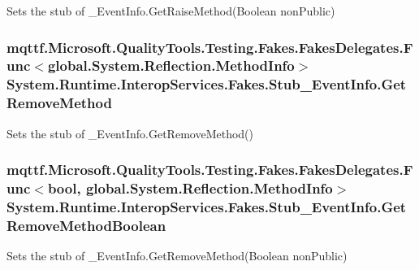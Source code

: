 Sets the stub of \-\_\-\-Event\-Info.\-Get\-Raise\-Method(\-Boolean non\-Public)

\hypertarget{class_system_1_1_runtime_1_1_interop_services_1_1_fakes_1_1_stub___event_info_a3388e6eb0ce18fe4f7c1a57a33a1981a}{
\subsubsection[{Get\-Remove\-Method}]{\setlength{\rightskip}{0pt plus 5cm}mqttf.\-Microsoft.\-Quality\-Tools.\-Testing.\-Fakes.\-Fakes\-Delegates.\-Func$<$global.\-System.\-Reflection.\-Method\-Info$>$ System.\-Runtime.\-Interop\-Services.\-Fakes.\-Stub\-\_\-\-Event\-Info.\-Get\-Remove\-Method}}\label{class_system_1_1_runtime_1_1_interop_services_1_1_fakes_1_1_stub___event_info_a3388e6eb0ce18fe4f7c1a57a33a1981a}


Sets the stub of \-\_\-\-Event\-Info.\-Get\-Remove\-Method()

\hypertarget{class_system_1_1_runtime_1_1_interop_services_1_1_fakes_1_1_stub___event_info_af1867c551e8ecffc2b48c7f5b8c49b60}{
\subsubsection[{Get\-Remove\-Method\-Boolean}]{\setlength{\rightskip}{0pt plus 5cm}mqttf.\-Microsoft.\-Quality\-Tools.\-Testing.\-Fakes.\-Fakes\-Delegates.\-Func$<$bool, global.\-System.\-Reflection.\-Method\-Info$>$ System.\-Runtime.\-Interop\-Services.\-Fakes.\-Stub\-\_\-\-Event\-Info.\-Get\-Remove\-Method\-Boolean}}\label{class_system_1_1_runtime_1_1_interop_services_1_1_fakes_1_1_stub___event_info_af1867c551e8ecffc2b48c7f5b8c49b60}


Sets the stub of \-\_\-\-Event\-Info.\-Get\-Remove\-Method(\-Boolean non\-Public)

